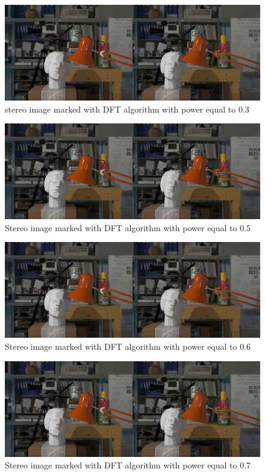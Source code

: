 \begin{figure}[h!]
\centering
\includegraphics[width=1\textwidth]{./img/marked_03_DFT.png}
\caption{\small{stereo image marked with DFT algorithm with power equal to 0.3}}
\label{fig:dft03}
\end{figure}
\begin{figure}[h!]
\centering
\includegraphics[width=1\textwidth]{./img/marked_05_DFT.png}
\caption{\small{Stereo image marked with DFT algorithm with power equal to 0.5}}
\label{fig:dft05}
\end{figure}
\begin{figure}[h!]
\centering
\includegraphics[width=1\textwidth]{./img/marked_06_DFT.png}
\caption{\small{Stereo image marked with DFT algorithm with power equal to 0.6}}
\label{fig:dft06}
\end{figure}
\begin{figure}[h!]
\centering
\includegraphics[width=1\textwidth]{./img/marked_07_DFT.png}
\caption{\small{Stereo image marked with DFT algorithm with power equal to 0.7}}
\label{fig:dft07}
\end{figure}

